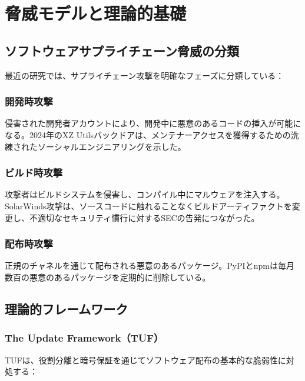 \documentclass[Specialissue]{jsaiart}
\begin{document}
\section{脅威モデルと理論的基礎}

\subsection{ソフトウェアサプライチェーン脅威の分類}

最近の研究では、サプライチェーン攻撃を明確なフェーズに分類している\cite{ladisa2023taxonomy,vu2024supplychain}：

\subsubsection{開発時攻撃}

侵害された開発者アカウントにより、開発中に悪意のあるコードの挿入が可能になる。2024年のXZ Utilsバックドア\cite{xz2024backdoor}は、メンテナーアクセスを獲得するための洗練されたソーシャルエンジニアリングを示した。

\subsubsection{ビルド時攻撃}

攻撃者はビルドシステムを侵害し、コンパイル中にマルウェアを注入する。SolarWinds攻撃\cite{fireeye2020sunburst}は、ソースコードに触れることなくビルドアーティファクトを変更し、不適切なセキュリティ慣行に対するSECの告発につながった\cite{solarwinds2024sec}。

\subsubsection{配布時攻撃}

正規のチャネルを通じて配布される悪意のあるパッケージ。PyPIとnpmは毎月数百の悪意のあるパッケージを定期的に削除している\cite{pypi2023malware,zimmermann2019npm}。

\subsection{理論的フレームワーク}

\subsubsection{The Update Framework（TUF）}

TUFは、役割分離と暗号保証を通じてソフトウェア配布の基本的な脆弱性に対処する\cite{kuppusamy2016tuf}：
\end{document}
